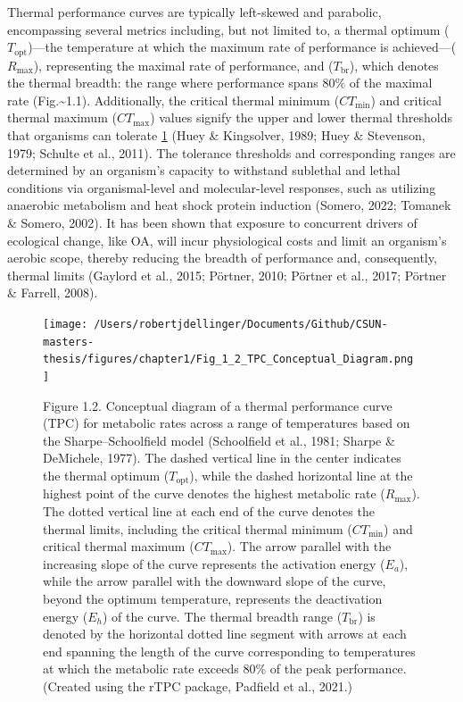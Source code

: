 \documentclass{CSUNthesis}
\begin{document}
Thermal performance curves are typically left-skewed and parabolic, encompassing several metrics including, but not limited to, a thermal optimum (\(T_{\text{opt}}\))---the temperature at which the maximum rate of performance is achieved---(\(R_{\text{max}}\)), representing the maximal rate of performance, and (\(T_{\text{br}}\)), which denotes the thermal breadth: the range where performance spans \(80\%\) of the maximal rate (Fig.\textasciitilde1.1). Additionally, the critical thermal minimum (\(CT_{\text{min}}\)) and critical thermal maximum (\(CT_{\text{max}}\)) values signify the upper and lower thermal thresholds that organisms can tolerate \ref{fig:tpc_conceptual_diagram} (Huey \& Kingsolver, 1989; Huey \& Stevenson, 1979; Schulte et al., 2011). The tolerance thresholds and corresponding ranges are determined by an organism's capacity to withstand sublethal and lethal conditions via organismal-level and molecular-level responses, such as utilizing anaerobic metabolism and heat shock protein induction (Somero, 2022; Tomanek \& Somero, 2002). It has been shown that exposure to concurrent drivers of ecological change, like OA, will incur physiological costs and limit an organism's aerobic scope, thereby reducing the breadth of performance and, consequently, thermal limits (Gaylord et al., 2015; Pörtner, 2010; Pörtner et al., 2017; Pörtner \& Farrell, 2008).

\newpage

\begin{figure}[ht]
  \centering
  \texttt{[image:  /Users/robertjdellinger/Documents/Github/CSUN-masters-thesis/figures/chapter1/Fig\_1\_2\_TPC\_Conceptual\_Diagram.png ]}
  \caption[Conceptual diagram of a thermal performance curve (TPC).]{Figure 1.2. Conceptual diagram of a thermal performance curve (TPC) for metabolic rates across a range of temperatures based on the Sharpe--Schoolfield model (Schoolfield et al., 1981; Sharpe \& DeMichele, 1977). The dashed vertical line in the center indicates the thermal optimum ($T_{\text{opt}}$), while the dashed horizontal line at the highest point of the curve denotes the highest metabolic rate ($R_{\text{max}}$). The dotted vertical line at each end of the curve denotes the thermal limits, including the critical thermal minimum ($CT_{\text{min}}$) and critical thermal maximum ($CT_{\text{max}}$). The arrow parallel with the increasing slope of the curve represents the activation energy ($E_a$), while the arrow parallel with the downward slope of the curve, beyond the optimum temperature, represents the deactivation energy ($E_h$) of the curve. The thermal breadth range ($T_{\text{br}}$) is denoted by the horizontal dotted line segment with arrows at each end spanning the length of the curve corresponding to temperatures at which the metabolic rate exceeds 80\% of the peak performance. (Created using the rTPC package, Padfield et al., 2021.)}
  \label{fig:tpc_conceptual_diagram}
\end{figure}
\end{document}
